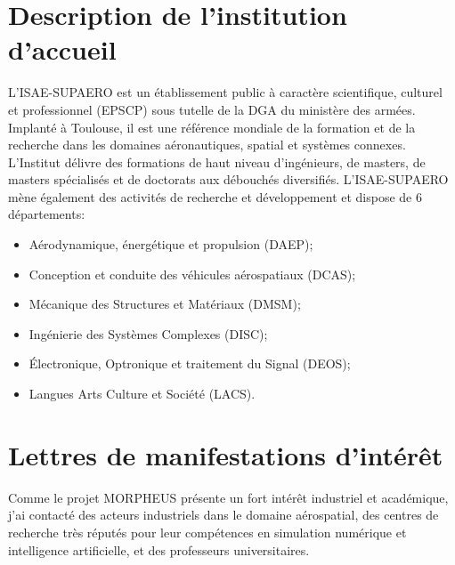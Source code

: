 \documentclass[12pt, french]{article}
\begin{document}
	
	
	
	
	\section{Description de l'institution d'accueil}
	
	L'ISAE-SUPAERO est un établissement public à caractère scientifique, culturel et professionnel (EPSCP) sous tutelle de la DGA du ministère des armées. Implanté à Toulouse, il est une référence mondiale de la formation et de la recherche dans les domaines aéronautiques, spatial et systèmes connexes. L'Institut délivre des
	formations de haut niveau d'ingénieurs, de masters, de masters spécialisés et de doctorats aux débouchés diversifiés. L'ISAE-SUPAERO mène également des activités de recherche et développement et dispose de 6 départements:
	\begin{itemize}
		\item Aérodynamique, énergétique et propulsion (DAEP);
		\item Conception et conduite des véhicules aérospatiaux (DCAS);
		\item Mécanique des Structures et Matériaux (DMSM);
		\item Ingénierie des Systèmes Complexes (DISC); 
		\item Électronique, Optronique et traitement du Signal (DEOS);
		\item Langues Arts Culture et Société (LACS).
	\end{itemize}

	\appendix
	
	\section{Lettres de manifestations d'intérêt}
	
	Comme le projet MORPHEUS présente un fort intérêt industriel et académique, j'ai contacté des acteurs industriels dans le domaine aérospatial, des centres de recherche très réputés pour leur compétences en simulation numérique et intelligence artificielle, et des professeurs universitaires. 
	\vspace{.5cm}
	
\end{document}
